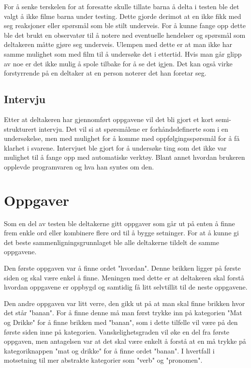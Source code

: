 For å senke terskelen for at foresatte skulle tillate barna å delta i testen ble det valgt å ikke filme barna under testing. Dette gjorde derimot at en ikke fikk med seg reaksjoner eller spørsmål som ble stilt underveis. For å kunne fange opp dette ble det brukt en observatør til å notere ned eventuelle hendelser og spørsmål som deltakeren måtte gjøre seg underveis. Ulempen med dette er at man ikke har samme mulighet som med film til å undersøke det i ettertid. Hvis man går glipp av noe er det ikke mulig å spole tilbake for å se det igjen. Det kan også virke forstyrrende på en deltaker at en person noterer det han foretar seg. 

 
\subsection{Intervju} 

Etter at deltakeren har gjennomført oppgavene vil det bli gjort et kort semi-strukturert intervju. Det vil si at spørsmålene er forhåndsdefinerte som i en undersøkelse, men med mulighet for å komme med oppfølgingsspørsmål for å få klarhet i svarene. Intervjuet ble gjort for å undersøke ting som det ikke var mulighet til å fange opp med automatiske verktøy. Blant annet hvordan brukeren opplevde programvaren og hva han syntes om den. 
 
\section{Oppgaver} 

Som en del av testen ble deltakerne gitt oppgaver som går ut på enten å finne frem enkle ord eller kombinere flere ord til å bygge setninger. For at å kunne gi det beste sammenligningsgrunnlaget ble alle deltakerne tildelt de samme oppgavene. 
 
Den første oppgaven var å finne ordet "hvordan". Denne brikken ligger på første siden og skal være enkel å finne. Meningen med dette er at deltakeren skal forstå hvordan oppgavene er oppbygd og samtidig få litt selvtillit til de neste oppgavene. 
 
Den andre oppgaven var litt verre, den gikk ut på at man skal finne brikken hvor det står "banan". For å finne denne må man først trykke inn på kategorien "Mat og Drikke" for å finne brikken med "banan", som i dette tilfelle vil være på den første siden inne på kategorien. Vanskelighetsgraden vil øke en del fra første oppgaven, men antagelsen var at det skal være enkelt å forstå at en må trykke på kategoriknappen "mat og drikke" for å finne ordet "banan". I hvertfall i motsetning til mer abstrakte kategorier som "verb" og "pronomen". 
 
